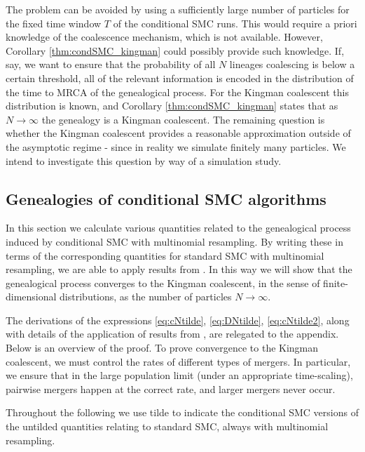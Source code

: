 \documentclass[fleqn]{article}
\theoremstyle{definition}
\begin{document}
The problem can be avoided by using a sufficiently large number of particles for the fixed time window $T$ of the conditional SMC runs. This would require a priori knowledge of the coalescence mechanism, which is not available. However, Corollary \ref{thm:condSMC_kingman} could possibly provide such knowledge.
If, say, we want to ensure that the probability of all $N$ lineages coalescing is below a certain threshold, all of the relevant information is encoded in the distribution of the time to MRCA of the genealogical process. For the Kingman coalescent this distribution is known, and Corollary \ref{thm:condSMC_kingman} states that as $N\to\infty$ the genealogy is a Kingman coalescent.
The remaining question is whether the Kingman coalescent provides a reasonable approximation outside of the asymptotic regime - since in reality we simulate finitely many particles. We intend to investigate this question by way of a simulation study.

\subsection{Genealogies of conditional SMC algorithms}\label{sec:condSMC_maths}
In this section we calculate various quantities related to the genealogical process induced by conditional SMC with multinomial resampling. By writing these in terms of the corresponding quantities for standard SMC with multinomial resampling, we are able to apply results from \citet{koskela2018}. In this way we will show that the genealogical process converges to the Kingman coalescent, in the sense of finite-dimensional distributions, as the number of particles $N\to\infty$.

The derivations of the expressions \eqref{eq:cNtilde}, \eqref{eq:DNtilde}, \eqref{eq:cNtilde2}, along with details of the application of results from \citet{koskela2018}, are relegated to the appendix. Below is an overview of the proof.
To prove convergence to the Kingman coalescent, we must control the rates of different types of mergers. In particular, we ensure that in the large population limit (under an appropriate time-scaling), pairwise mergers happen at the correct rate, and larger mergers never occur.

Throughout the following we use tilde to indicate the conditional SMC versions of the untilded quantities relating to standard SMC, always with multinomial resampling.
\end{document}
